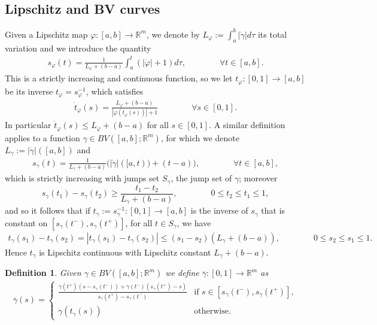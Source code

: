 \documentclass[a4paper,11pt]{article}
\numberwithin{equation}{section}
\newtheorem{definition}[theorem]{Definition}
\newcommand{\R}{\mathbb{R}}
\begin{document}
\subsection{Lipschitz and BV curves}
Given a Lipschitz map $\varphi:[a,b]\rightarrow \R^m$, we denote by $L_\varphi:=\int_a^b|\dot\gamma|d\tau$ its total variation and we introduce the quantity 
\begin{align}\label{s_varphi}
s_\varphi(t)=\frac{1}{L_\varphi+(b-a)}\int_a^t(|\dot \varphi|+1)d\tau, \qquad \qquad \forall t\in [a,b].
\end{align}
This is a strictly increasing and continuous function, so we let $t_\varphi:[0,1]\rightarrow[a,b]$ be its inverse $t_\varphi=s_\varphi^{-1}$, which satisfies
\begin{align}\label{t_varphi}
	\dot t_\varphi(s)=\frac{L_\varphi+(b-a)}{|\dot \varphi(t_\varphi(s))|+1}\qquad \qquad \forall s\in [0,1].
\end{align} 
In particular $	\dot t_\varphi(s)\leq L_\varphi+(b-a)$ for all $s\in [0,1]$. A similar definition applies to a function
 $\gamma\in BV([a,b];\R^m)$, for which  we denote  $L_\gamma:=|\dot \gamma|([a,b])$ and 
\begin{align}\label{s_gamma}
s_\gamma(t)=\frac{1}{L_\gamma+(b-a)}\big(|\dot\gamma|([a,t))+(t-a)\big), \qquad \qquad \forall t\in [a,b],
\end{align}
which is strictly increasing with jumps set $S_\gamma$, the jump set of $\gamma$; moreover 
$$s_\gamma(t_1)-s_\gamma(t_2)\geq \frac{t_1-t_2}{L_\gamma+(b-a)},\qquad \qquad 0\leq t_2\leq t_1\leq1,$$
and so it follows that if  $ t_\gamma:=s_\gamma^{-1}:[0,1]\rightarrow [a,b]$ is the inverse of $s_\gamma$ that is constant on $[s_\gamma(t^-),s_\gamma(t^+)]$, for all $t\in S_\gamma$, we have
\begin{align*}
t_\gamma(s_1)-t_\gamma(s_2)=|t_\gamma(s_1)-t_\gamma(s_2)|\leq (s_1-s_2)(L_\gamma+(b-a)),\qquad \qquad 0\leq s_2\leq s_1\leq1.
\end{align*}
Hence $t_\gamma$ is Lipschitz continuous with Lipschitz constant $L_\gamma+(b-a)$.
\begin{definition}
Given $\gamma\in BV([a,b];\R^m)$ we define $\overline \gamma:[0,1]\rightarrow \R^m$ as  
\begin{align}\label{gencurve}
	\overline \gamma(s)=\begin{cases}
		\frac{\gamma(t^+)(s-s_\gamma(t^-))+\gamma(t^-)(s_\gamma(t^+)-s)}{s_\gamma(t^+)-s_\gamma(t^-)}&\text{if }s\in [s_\gamma(t^-),s_\gamma(t^+)],\\
		\gamma(t_\gamma(s))&\text{otherwise.}
	\end{cases}
\end{align}
\end{definition}
\end{document}
